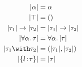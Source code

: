 
\begin{align*}
  \im \alpha                    &= \alpha \\
  \im \top                      &= () \\
  \im {\tau_1} \to \im {\tau_2} &= \im {\tau_1} \to \im {\tau_2} \\
  \im {\for \alpha \tau}        &= \for \alpha \im \tau \\
  \im {\tau_1 \andop \tau_2}    &= \pair {\im {\tau_1}} {\im {\tau_2}} \\
  \im {\recty l \tau}           &= \im \tau
\end{align*}